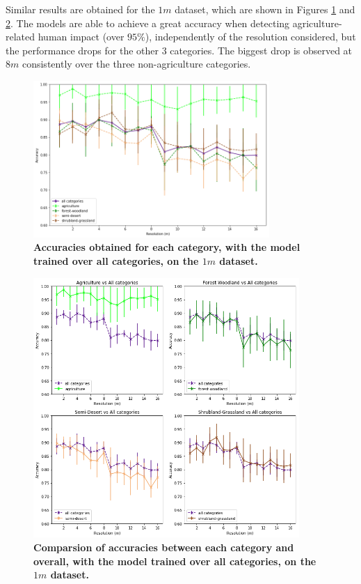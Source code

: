 Similar results are obtained for the $1m$ dataset, which are shown in Figures \ref{fig:acc_all_cat_1m} and \ref{fig:acc_by_cat_1m}. The models are able to achieve a great accuracy when detecting agriculture-related human impact (over $95\%$), independently of the resolution considered, but the performance drops for the other 3 categories. The biggest drop is observed at $8m$ consistently over the three non-agriculture categories. 

\begin{figure}[H]
	\centering
	\includegraphics[width=0.8\textwidth]{Figures/results/acc_res_all_categories_1m.png}
	\captionsetup{width=1\linewidth}
	\caption{\textbf{Accuracies obtained for each category, with the model trained over all categories, on the $1m$ dataset.}}
	\label{fig:acc_all_cat_1m}
\end{figure}

\begin{figure}[H]
	\centering
	\includegraphics[width=0.9\textwidth]{Figures/results/acc_res_by_category_1m.png}
	\captionsetup{width=1\linewidth}
	\caption{\textbf{Comparsion of accuracies between each category and overall, with the model trained over all categories, on the $1m$ dataset.}}
	\label{fig:acc_by_cat_1m}
\end{figure}


